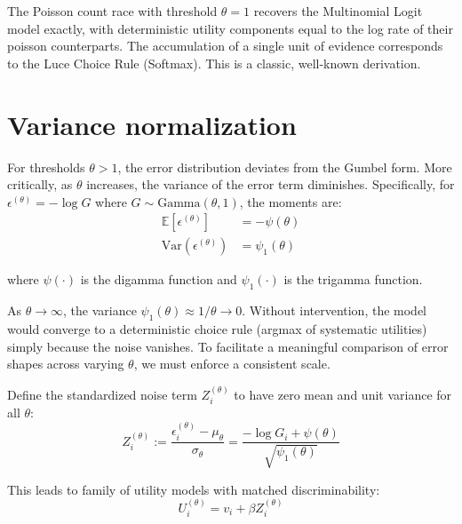 \documentclass[
  man,
  floatsintext,
  longtable,
  a4paper,
  nolmodern,
  notxfonts,
  notimes,
  colorlinks=true,linkcolor=blue,citecolor=blue,urlcolor=blue]{apa7}
\begin{document}
\begin{tcolorbox}[enhanced jigsaw, colframe=quarto-callout-note-color-frame, leftrule=.75mm, colbacktitle=quarto-callout-note-color!10!white, titlerule=0mm, bottomrule=.15mm, opacityback=0, rightrule=.15mm, toptitle=1mm, bottomtitle=1mm, breakable, title={Result 2 (Logit Boundary)}, arc=.35mm, coltitle=black, opacitybacktitle=0.6, left=2mm, toprule=.15mm, colback=white]

The Poisson count race with threshold \(\theta=1\) recovers the
Multinomial Logit model exactly, with deterministic utility components
equal to the log rate of their poisson counterparts. The accumulation of
a single unit of evidence corresponds to the Luce Choice Rule (Softmax).
This is a classic, well-known derivation.

\end{tcolorbox}

\section{Variance normalization}\label{sec-variance-normalization}

For thresholds \(\theta > 1\), the error distribution deviates from the
Gumbel form. More critically, as \(\theta\) increases, the variance of
the error term diminishes. Specifically, for
\(\epsilon^{(\theta)} = -\log G\) where
\(G \sim \text{Gamma}(\theta, 1)\), the moments are: \[
\begin{aligned} \mathbb{E}[\epsilon^{(\theta)}] &= -\psi(\theta) \\ \text{Var}(\epsilon^{(\theta)}) &= \psi_1(\theta) \end{aligned}
\]

where \(\psi(\cdot)\) is the digamma function and \(\psi_1(\cdot)\) is
the trigamma function.

As \(\theta \to \infty\), the variance
\(\psi_1(\theta) \approx 1/\theta \to 0\). Without intervention, the
model would converge to a deterministic choice rule (argmax of
systematic utilities) simply because the noise vanishes. To facilitate a
meaningful comparison of error shapes across varying \(\theta\), we must
enforce a consistent scale.

Define the standardized noise term \(Z_i^{(\theta)}\) to have zero mean
and unit variance for all \(\theta\): \[
Z_i^{(\theta)} := \frac{\epsilon_i^{(\theta)} - \mu_\theta}{\sigma_\theta} = \frac{-\log G_i + \psi(\theta)}{\sqrt{\psi_1(\theta)}}
\]

This leads to family of utility models with matched discriminability: \[
U_i^{(\theta)} = v_i + \beta Z_i^{(\theta)}
\]
\end{document}
